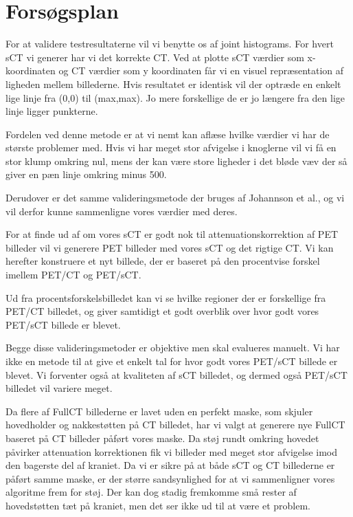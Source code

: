 \section{Forsøgsplan}

For at validere testresultaterne vil vi benytte os af joint histograms. For hvert sCT vi generer har vi det korrekte CT. Ved at plotte sCT værdier som x-koordinaten og CT værdier som y koordinaten får vi en visuel repræsentation af ligheden mellem billederne. Hvis resultatet er identisk vil der optræde en enkelt lige linje fra (0,0) til (max,max). Jo mere forskellige de er jo længere fra den lige linje ligger punkterne.

Fordelen ved denne metode er at vi nemt kan aflæse hvilke værdier vi har de største problemer med. Hvis vi har meget stor afvigelse i knoglerne vil vi få en stor klump omkring nul, mens der kan være store ligheder i det bløde væv der så giver en pæn linje omkring minus 500.

Derudover er det samme valideringsmetode der bruges af Johannson et al., og vi vil derfor kunne sammenligne vores værdier med deres.

For at finde ud af om vores sCT er godt nok til attenuationskorrektion af PET billeder vil vi generere PET billeder med vores sCT og det rigtige CT. Vi kan herefter konstruere et nyt billede, der er baseret på den procentvise forskel imellem PET/CT og PET/sCT. 

Ud fra procentsforskelsbilledet kan vi se hvilke regioner der er forskellige fra PET/CT billedet, og giver samtidigt et godt overblik over hvor godt vores PET/sCT billede er blevet.

Begge disse valideringsmetoder er objektive men skal evalueres manuelt. Vi har ikke en metode til at give et enkelt tal for hvor godt vores PET/sCT billede er blevet. Vi forventer også at kvaliteten af sCT billedet, og dermed også PET/sCT billedet vil variere meget.


Da flere af FullCT billederne er lavet uden en perfekt maske, som skjuler hovedholder og nakkestøtten på CT billedet, har vi valgt at generere nye FullCT baseret på CT billeder påført vores maske. Da støj rundt omkring hovedet påvirker attenuation korrektionen fik vi billeder med meget stor afvigelse imod den bagerste del af kraniet. Da vi er sikre på at både sCT og CT billederne er påført samme maske, er der større sandsynlighed for at vi sammenligner vores algoritme frem for støj. Der kan dog stadig fremkomme små rester af hovedstøtten tæt på kraniet, men det ser ikke ud til at være et problem.

